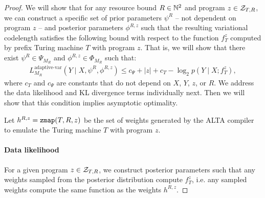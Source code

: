 \begin{proof}
We will show that for any resource bound $R \in {\mathbb{N}^2}$ and program $z \in {\mathcal{Z}}_{T,R}$, we can construct a specific set of prior parameters $\psi^{R}$ -- not dependent on program $z$ -- and posterior parameters $\phi^{R,z}$ such that the resulting variational codelength satisfies the following bound with respect to the function $f_T^z$ computed by prefix Turing machine $T$ with program $z$. 
That is, we will show that there exist $\psi^{R} \in \Psi_{M_R}$ and $\phi^{R,z} \in \Phi_{M_R}$ such that:
\begin{align}
L_{M_R}^{\text{adaptive-var}}(Y \mid X, \psi^R, \phi^{R,z}) \leq c_\Psi + |z| + c_T - \log_2 p(Y \mid X; f_T^z),
\end{align}
where $c_T$ and $c_\Psi$ are constants that do not depend on $X$, $Y$, $z$, or $R$.
We address the data likelihood and KL divergence terms individually next. Then we will show that this condition implies asymptotic optimality. 

Let $h^{R,z} = \texttt{zmap}(T,R,z)$ be the set of weights generated by the ALTA compiler to emulate the Turing machine $T$ with program $z$.

\paragraph{Data likelihood}

For a given program $z \in {\mathcal{Z}}_{T,R}$, we construct posterior parameters such that any weights sampled from the posterior distribution compute $f_T^z$, i.e. any sampled weights compute the same function as the weights $h^{R,z}$.


\end{proof}
